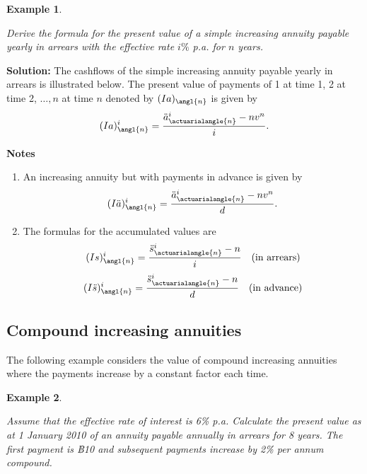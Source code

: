 \documentclass[landscape, 20pt]{extreport}
\theoremstyle{definition}
\theoremstyle{definition}
\newtheorem{example}{Example}[chapter]
\theoremstyle{definition}
\theoremstyle{definition}
\theoremstyle{remark}
\begin{document}
\newpage \begin{example}
\protect\hypertarget{exm:unlabeled-div-28}{}\label{exm:unlabeled-div-28}

\emph{Derive the formula for the present value of a simple
increasing annuity payable yearly in arrears with the effective rate
\(i\%\) p.a. for \(n\) years.}

\end{example}

\textbf{Solution:} The cashflows of the simple increasing annuity payable
yearly in arrears is illustrated below. The present value of payments of
1 at time 1, 2 at time 2, \(\ldots, n\) at time \(n\) denoted by
\((Ia)_\angl{n}\) is given by
\[(Ia)^{i}_\angl{n}   = \frac{\ddot{a}^{i}_{\actuarialangle{n}} - nv^n}{i}.\]

\textbf{Notes}

\begin{enumerate}
\def\labelenumi{\arabic{enumi}.}
\item
  An increasing annuity but with payments in advance is given by
  \[(I\ddot{a})^{i}_\angl{n}   = \frac{\ddot{a}^{i}_{\actuarialangle{n}} - nv^n}{d}.\]
\item
  The formulas for the accumulated values are
  \[(Is)^{i}_\angl{n} = \frac{\ddot{s}^{i}_{\actuarialangle{n}} - n}{i} \quad\text{(in arrears)}\]
  \[(I\ddot{s})^{i}_\angl{n} = \frac{\ddot{s}^{i}_{\actuarialangle{n}} - n}{d} \quad\text{(in advance)}\]
\end{enumerate}

\hypertarget{compound-increasing-annuities}{%
\subsection{Compound increasing annuities}\label{compound-increasing-annuities}}

The following example considers the value of compound increasing
annuities where the payments increase by a constant factor each time.

\newpage \begin{example}
\protect\hypertarget{exm:unlabeled-div-29}{}\label{exm:unlabeled-div-29}

\emph{Assume that the effective rate of interest is 6\% p.a.
Calculate the present value as at 1 January 2010 of an annuity payable
annually in arrears for 8 years. The first payment is ฿10 and subsequent
payments increase by 2\% per annum compound.}

\end{example}
\end{document}
